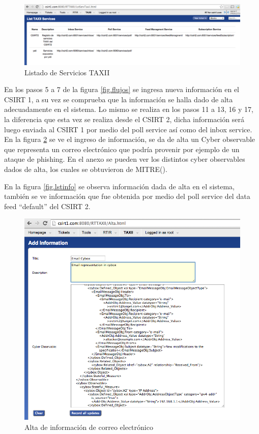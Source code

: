 \begin{figure}[H]
	\centering
	\includegraphics[scale=0.35]{caso-de-estudio/listadoservicios.png}
	\caption{Listado de Servicios TAXII}
	\label{fig.lstservicios}
\end{figure}

En los pasos 5 a 7 de la figura \ref{fig.flujos} se ingresa nueva información en el CSIRT 1, a su vez se comprueba que la información se halla dado de alta adecuadamente en el sistema. Lo mismo se realiza en los pasos 11 a 13, 16 y 17, la diferencia que esta vez se realiza desde el CSIRT 2, dicha información será luego enviada al CSIRT 1 por medio del poll service así como del inbox service.
En la figura \ref{fig.altacorreo} se ve el ingreso de información, se da de alta un Cyber observable que representa un correo electrónico que podría provenir por ejemplo de un ataque de phishing. En el anexo se pueden ver los distintos cyber observables dados de alta, los cuales se obtuvieron de MITRE(\cite{mitre}).

En la figura \ref{fig.lstinfo} se observa información dada de alta en el sistema, también se ve información que fue obtenida por medio del poll service del data feed “default” del CSIRT 2.

\begin{figure}[H]
	\centering
	\includegraphics[scale=0.6]{caso-de-estudio/alta.png}
	\caption{Alta de información de correo electrónico}
	\label{fig.altacorreo}
\end{figure}


